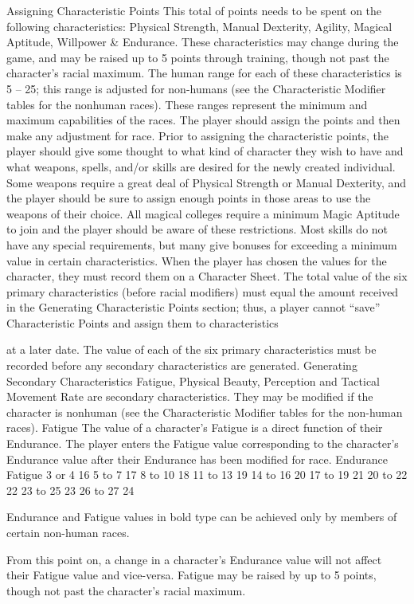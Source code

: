 \documentclass[a4paper]{article}
\begin{document}
\begin{multicols}{3}
Assigning Characteristic Points
This total of points needs to be spent on the following characteristics: Physical Strength, Manual
Dexterity, Agility, Magical Aptitude, Willpower \&
Endurance. These characteristics may change
during the game, and may be raised up to 5 points
through training, though not past the character’s
racial maximum.
The human range for each of these characteristics
is 5 – 25; this range is adjusted for non-humans
(see the Characteristic Modifier tables for the nonhuman races). These ranges represent the minimum
and maximum capabilities of the races. The player
should assign the points and then make any adjustment for race.
Prior to assigning the characteristic points, the
player should give some thought to what kind of
character they wish to have and what weapons,
spells, and/or skills are desired for the newly created individual. Some weapons require a great deal
of Physical Strength or Manual Dexterity, and the
player should be sure to assign enough points in
those areas to use the weapons of their choice. All
magical colleges require a minimum Magic Aptitude to join and the player should be aware of these
restrictions. Most skills do not have any special
requirements, but many give bonuses for exceeding
a minimum value in certain characteristics.
When the player has chosen the values for the
character, they must record them on a Character
Sheet. The total value of the six primary characteristics (before racial modifiers) must equal the
amount received in the Generating Characteristic
Points section; thus, a player cannot “save” Characteristic Points and assign them to characteristics

at a later date. The value of each of the six primary
characteristics must be recorded before any secondary characteristics are generated.
Generating Secondary Characteristics
Fatigue, Physical Beauty, Perception and Tactical
Movement Rate are secondary characteristics.
They may be modified if the character is nonhuman (see the Characteristic Modifier tables for
the non-human races).
Fatigue
The value of a character’s Fatigue is a direct function of their Endurance. The player enters the Fatigue value corresponding to the character’s Endurance value after their Endurance has been modified
for race.
Endurance Fatigue
3 or 4
16
5 to 7
17
8 to 10
18
11 to 13
19
14 to 16
20
17 to 19
21
20 to 22
22
23 to 25
23
26 to 27
24

Endurance and Fatigue values in bold type can be
achieved only by members of certain non-human
races.

From this point on, a change in a character’s Endurance value will not
affect their Fatigue value and vice-versa. Fatigue may be raised by up
to 5 points, though not past the character’s racial maximum.


\end{multicols}
\end{document}
